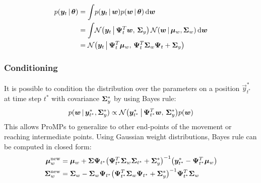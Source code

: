 			\begin{align*}
				p(\bm{y}_t \,\vert\, \bm{\theta})
				 & = \int\! p(\bm{y}_t \,\vert\, \bm{w}) p(\bm{w} \,\vert\, \bm{\theta}) \dd{\bm{w}}                                                                                     \\
				 & = \int\! \mathcal{N}\big( \bm{y}_t \,\big\vert\, \bm{\Psi}_t^T \bm{w},\, \bm{\Sigma}_y \big) \, \mathcal{N}(\bm{w} \,\vert\, \bm{\mu}_w, \bm{\Sigma}_w) \dd{\bm{w}} \\
				 & = \mathcal{N}\big( \bm{y}_t \,\big\vert\, \bm{\Psi}_t^T \bm{\mu}_w,\, \bm{\Psi}_t^T \bm{\Sigma}_w \bm{\Psi}_t + \bm{\Sigma}_y \big)
			\end{align*}

			\subsubsection{Conditioning}
				It is possible to condition the distribution over the parameters on a position \( \vec{y}_{t^\ast}^\ast \) at time step \(t^\ast\) with covariance \( \bm{\Sigma}_y^\ast \) by using Bayes rule:
				\begin{equation*}
					p(\bm{w} \,\vert\, \bm{y}_{t^\ast}^\ast, \bm{\Sigma}_y^\ast) \propto \mathcal{N}\big( \bm{y}_{t^\ast}^\ast \,\big\vert\, \bm{\Psi}_{t^\ast}^T \bm{w},\, \bm{\Sigma}_y^\ast \big) p(\bm{w})
				\end{equation*}
				This allows ProMPs to generalize to other end-points of the movement or reaching intermediate points. Using Gaussian weight distributions, Bayes rule can be computed in closed form:
				\begin{align*}
					\bm{\mu}_w^\mathrm{new}    & = \bm{\mu}_w + \bm{\Sigma} \bm{\Psi}_{t^\ast} \big( \bm{\Psi}_{t^\ast}^T \bm{\Sigma}_w \bm{\Sigma}_{t^\ast} + \bm{\Sigma}_y^\ast \big)^{-1} \big( \bm{y}_{t^\ast}^\ast - \bm{\Psi}_{t^\ast}^T \bm{\mu}_w \big) \\
					\bm{\Sigma}_w^\mathrm{new} & = \bm{\Sigma}_w - \bm{\Sigma}_w \bm{\Psi}_{t^\ast} \big( \bm{\Psi}_{t^\ast}^T \bm{\Sigma}_w \bm{\Psi}_{t^\ast} + \bm{\Sigma}_y^\ast \big)^{-1} \bm{\Psi}_{t^\ast}^T \bm{\Sigma}_w
				\end{align*}

